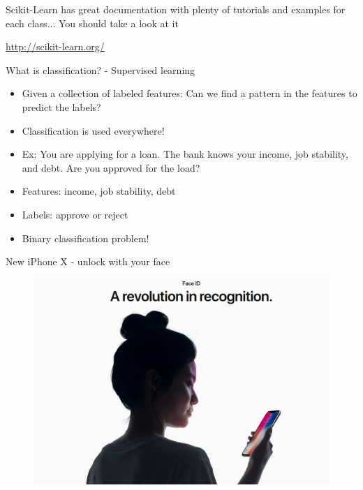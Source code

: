 \documentclass[10pt]{beamer}
\begin{document}
\begin{frame}{Scikit-Learn has great documentation}
with plenty of tutorials and examples for each class... You should take a look at it

\url{http://scikit-learn.org/}

\end{frame}

\begin{frame}{What is classification? - Supervised learning}
\begin{itemize}
\item Given a collection of labeled features: Can we find a pattern in the features to predict the labels?
\item Classification is used everywhere!
\item Ex: You are applying for a loan. The bank knows your income, job stability, and debt. Are you approved for the load?
\item Features: income, job stability, debt
\item Labels: approve or reject
\item Binary classification problem!
\end{itemize}
\end{frame}

\begin{frame}{New iPhone X - unlock with your face}
\begin{figure}
\includegraphics[width=1.0\textwidth]{figs/iphonex.png}
\end{figure}
\end{frame}
\end{document}
